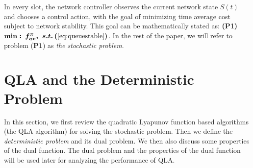 \documentclass[journal]{IEEEtran}
\newcommand{\bv}[1]{{\boldsymbol{#1} }}
\begin{document}
In every slot, the network controller observes the current network state $S(t)$ and chooses a control action, with the goal of minimizing time average cost subject to network stability. This goal can be mathematically stated as:
\textbf{(P1)}\,\,\, $\bv{\min: \,  f^{\pi}_{av}, \,\, s.t.\,  (\ref{eq:queuestable})}$. 
In the rest of the paper, we will refer to problem (\textbf{P1}) as \emph{the stochastic problem}. %

\section{QLA and the Deterministic Problem}\label{section:qlareview}
In this section, we first review the quadratic Lyapunov function based algorithms (the QLA algorithm) \cite{neelynowbook} for solving the stochastic problem. Then we define the \emph{deterministic problem} and its dual problem. We then also discuss some properties of the dual function. The dual problem and the properties of the dual function will be used later for analyzing the performance of QLA. 

\end{document}
